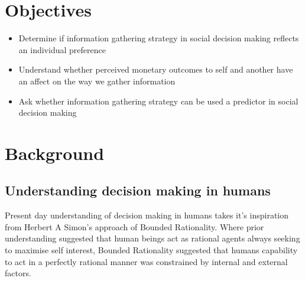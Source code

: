 \documentclass[man, floatsintext]{apa7}
\begin{document}
\section{Objectives}

\begin{itemize}
	\item Determine if information gathering strategy in social decision making reflects an individual preference
	\item Understand whether perceived monetary outcomes to self and another have an affect on the way we gather information
	\item Ask whether information gathering strategy can be used a predictor in social decision making
\end{itemize}

\section{Background}

\subsection{Understanding decision making in humans}

Present day understanding of decision making in humans takes it's inspiration from Herbert A Simon's approach of Bounded Rationality. Where prior understanding suggested that human beings act as  rational agents always seeking to maximise self interest, Bounded Rationality suggested that humans capability to act in a perfectly rational manner was constrained by internal and external factors.

\end{document}
